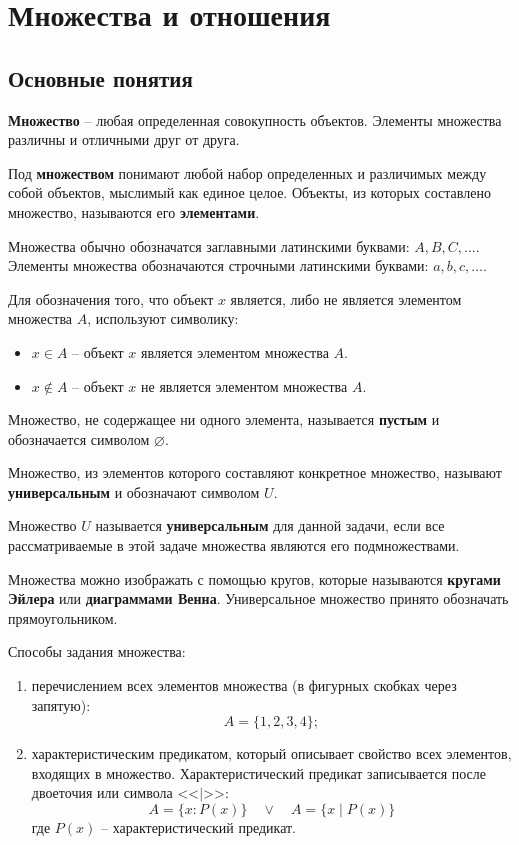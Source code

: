 \documentclass[a5paper, 11pt]{extarticle}
\author{Daniil Shvalov}
\date{\today}
\title{}
\theoremstyle{definition}
\theoremstyle{definition}
\theoremstyle{definition}
\numberwithin{figure}{section}
\numberwithin{table}{section}
\begin{document}
\hypersetup{linktoc = all, colorlinks = true, urlcolor = DodgerBlue4, citecolor = PaleGreen1, linkcolor = black}
\tableofcontents
\hypersetup{linktoc = all, colorlinks = true, urlcolor = DodgerBlue4, citecolor = PaleGreen1, linkcolor = blue}
\newpage

\section{Множества и отношения}

\subsection{Основные понятия}

\textbf{Множество} -- любая определенная совокупность объектов. Элементы множества различны и отличными друг от друга.

Под \textbf{множеством} понимают любой набор определенных и различимых между собой объектов, мыслимый как единое целое. Объекты, из которых составлено множество, называются его \textbf{элементами}.

Множества обычно обозначатся заглавными латинскими буквами: \(A, B, C, \ldots\). Элементы множества обозначаются строчными латинскими буквами: \(a, b, c, \ldots\).

Для обозначения того, что объект \(x\) является, либо не является элементом множества \(A\), используют символику:
\begin{itemize}
    \item \(x \in A\) -- объект \(x\) является элементом множества \(A\).
    \item \(x \notin A\) -- объект \(x\) не является элементом множества \(A\).
\end{itemize}

Множество, не содержащее ни одного элемента, называется \textbf{пустым} и обозначается символом \(\varnothing\).

Множество, из элементов которого составляют конкретное множество, называют \textbf{универсальным} и обозначают символом \(U\).

Множество \(U\) называется \textbf{универсальным} для данной задачи, если все рассматриваемые в этой задаче множества являются его подмножествами.

Множества можно изображать с помощью кругов, которые называются \textbf{кругами Эйлера} или \textbf{диаграммами Венна}. Универсальное множество принято обозначать прямоугольником.

Способы задания множества:
\begin{enumerate}
    \item перечислением всех элементов множества (в фигурных скобках через запятую):
          \[
              A = \{1, 2, 3, 4\};
          \]
    \item характеристическим предикатом, который описывает свойство всех элементов, входящих в множество. Характеристический предикат записывается после двоеточия или символа <<\(\mid\)>>:
          \[
              A = \{x: P(x)\}
              \quad
              \lor
              \quad
              A = \{x \mid P(x)\}
          \]
          где \(P(x)\) -- характеристический предикат.
\end{enumerate}
\end{document}
